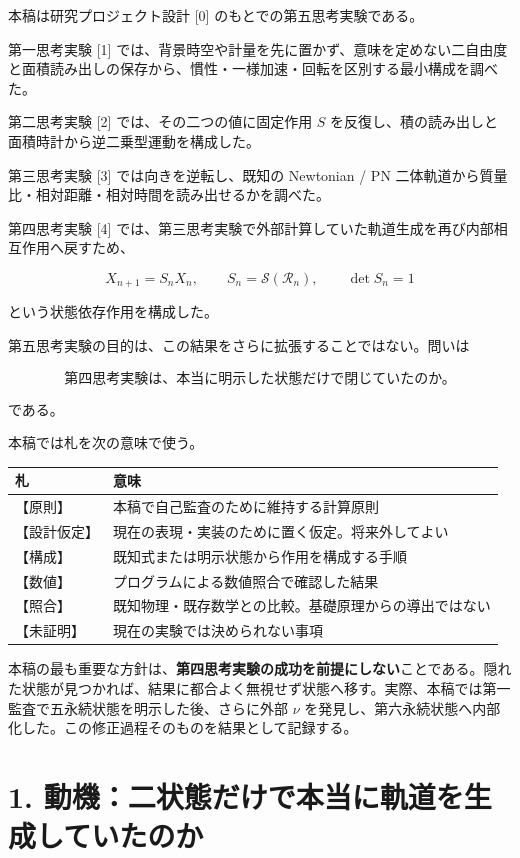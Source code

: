 \documentclass[
  a4paper,
]{ltjsarticle}
\newcounter{none} %
\begin{document}
本稿は研究プロジェクト設計 {[}0{]} のもとでの第五思考実験である。

第一思考実験 {[}1{]}
では、背景時空や計量を先に置かず、意味を定めない二自由度と面積読み出しの保存から、慣性・一様加速・回転を区別する最小構成を調べた。

第二思考実験 {[}2{]} では、その二つの値に固定作用 \(S\)
を反復し、積の読み出しと面積時計から逆二乗型運動を構成した。

第三思考実験 {[}3{]} では向きを逆転し、既知の Newtonian / PN
二体軌道から質量比・相対距離・相対時間を読み出せるかを調べた。

第四思考実験 {[}4{]}
では、第三思考実験で外部計算していた軌道生成を再び内部相互作用へ戻すため、

\[
X_{n+1}=S_nX_n,
\qquad
S_n=\mathcal S(\mathcal R_n),
\qquad
\det S_n=1
\]

という状態依存作用を構成した。

第五思考実験の目的は、この結果をさらに拡張することではない。問いは

\[
\boxed{
\text{第四思考実験は、本当に明示した状態だけで閉じていたのか。}
}
\]

である。

本稿では札を次の意味で使う。

{\def\LTcaptype{none} %
\begin{longtable}[]{@{}ll@{}}
\toprule\noalign{}
札 & 意味 \\
\midrule\noalign{}
\endhead
\bottomrule\noalign{}
\endlastfoot
【原則】 & 本稿で自己監査のために維持する計算原則 \\
【設計仮定】 & 現在の表現・実装のために置く仮定。将来外してよい \\
【構成】 & 既知式または明示状態から作用を構成する手順 \\
【数値】 & プログラムによる数値照合で確認した結果 \\
【照合】 & 既知物理・既存数学との比較。基礎原理からの導出ではない \\
【未証明】 & 現在の実験では決められない事項 \\
\end{longtable}
}

本稿の最も重要な方針は、\textbf{第四思考実験の成功を前提にしない}ことである。隠れた状態が見つかれば、結果に都合よく無視せず状態へ移す。実際、本稿では第一監査で五永続状態を明示した後、さらに外部
\(\nu\)
を発見し、第六永続状態へ内部化した。この修正過程そのものを結果として記録する。

\section{1.
動機：二状態だけで本当に軌道を生成していたのか}\label{ux52d5ux6a5fux4e8cux72b6ux614bux3060ux3051ux3067ux672cux5f53ux306bux8eccux9053ux3092ux751fux6210ux3057ux3066ux3044ux305fux306eux304b}
\end{document}
